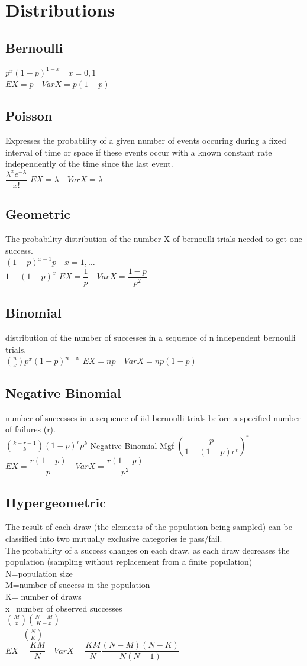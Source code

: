 \documentclass[openany]{book}
\begin{document}
\tableofcontents
\chapter{Distributions}
\section{Bernoulli}
$p^x(1-p)^{1-x} \quad x=0,1$\\
$EX=p \quad VarX=p(1-p)$
\section{Poisson}
Expresses the probability of a given number of events occuring during a fixed interval of time or space if these events occur with a known constant rate independently of the time since the last event.\\
$\dfrac{\lambda^x e^{-\lambda}}{x!}$\medbreak
$EX=\lambda \quad VarX= \lambda$
\section{Geometric}
The probability distribution of the number X of bernoulli trials needed to get one success.\\
$(1-p)^{x-1}p \quad x=1,\dots$\\
$1-(1-p)^x$\medbreak
$EX=\dfrac{1}{p} \quad VarX=\dfrac{1-p}{p^2}$
\section{Binomial}
distribution of the number of successes in a sequence of n independent bernoulli trials.\\
$\binom{n}{x} p^x(1-p)^{n-x}$ \medbreak
$EX=np \quad VarX=np(1-p)$
\section{Negative Binomial}
number of successes in a sequence of iid bernoulli trials before a specified number of failures (r).\\
$\binom{k+r-1}{k}(1-p)^r p^k$\medbreak
Negative Binomial Mgf $\left(\dfrac{p}{1-(1-p)e^t}\right)^r$\\
$EX=\dfrac{r(1-p)}{p} \quad VarX=\dfrac{r(1-p)}{p^2}$
\section{Hypergeometric}
The result of each draw (the elements of the population being sampled) can be classified into two mutually exclusive categories ie pass/fail.\\
The probability of a success changes on each draw, as each draw decreases the population (sampling without replacement from a finite population)\\
N=population size\\
M=number of success in the population\\
K= number of draws\\
x=number of observed successes\\
$\dfrac{\binom{M}{x}\binom{N-M}{K-x}}{\binom{N}{K}}$\\
$EX=\dfrac{KM}{N} \quad VarX= \dfrac{KM}{N}\dfrac{(N-M)(N-K)}{N(N-1)}$
\end{document}
